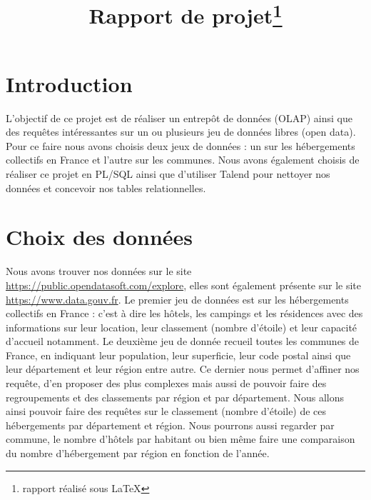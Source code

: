 \documentclass[a4paper,sffamily,12pt]{article}
\title{\vspace{\fill}\LARGE\bfseries\sffamily Rapport de projet\protect\footnote{rapport réalisé sous \LaTeX} \vspace{\fill}}
\begin{document}
	\date{} %
	\maketitle %

	\thispagestyle{fancy} %
	
	\newpage
			
	\renewcommand{\contentsname}{Sommaire}
	\tableofcontents
	
	\newpage
	
	\section{Introduction}

		\vspace{0.5cm}
		
		L'objectif de ce projet est de réaliser un entrepôt de données (OLAP) ainsi que des requêtes intéressantes sur un ou plusieurs jeu de données libres (open data). Pour ce faire nous avons choisis deux jeux de données : un sur les hébergements collectifs en France et l'autre sur les communes. Nous avons également choisis de réaliser ce projet en PL/SQL ainsi que d'utiliser Talend pour nettoyer nos données et concevoir nos tables relationnelles. \\

	\section{Choix des données}				

		\vspace{0.5cm}
		
		 Nous avons trouver nos données sur le site \url{https://public.opendatasoft.com/explore}, elles sont également présente sur le site \url{https://www.data.gouv.fr}. Le premier jeu de données est sur les hébergements collectifs en France : c'est à dire les hôtels, les campings et les résidences avec des informations sur leur location, leur classement (nombre d'étoile) et leur capacité d'accueil notamment. Le deuxième jeu de donnée recueil toutes les communes de France, en indiquant leur population, leur superficie, leur code postal ainsi que leur département et leur région entre autre. Ce dernier nous permet d'affiner nos requête, d'en proposer des plus complexes mais aussi de pouvoir faire des regroupements et des classements par région et par département. Nous allons ainsi pouvoir faire des requêtes sur le classement (nombre d'étoile) de ces hébergements par département et région. Nous pourrons aussi regarder par commune, le nombre d'hôtels par habitant ou bien même faire une comparaison du nombre d'hébergement par région en fonction de l'année. \\
\end{document}

